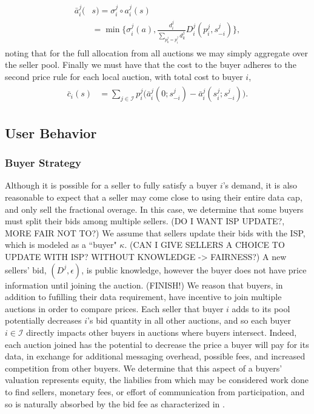 \documentclass[12pt]{article}
\theoremstyle{definition}
\newcommand{\mcI}{\mathcal{I}}
\newcommand{\g}{\sigma}
\begin{document}
\begin{multicols}{2}
\begin{align}
\begin{split}
    \bar{a}_i^j(&s) = \g_i^j \circ a_i^j(s) \\
    &= \min\bigg\lbrace \g_i^j(a), 
    \frac{d_i^j}{\displaystyle\sum_{p_k^j= p_i^j}d_k^j} 
D_i^j(p_i^j,s_{-i}^j)\bigg\rbrace,
\end{split}
\end{align}
noting that for the full allocation from all auctions we may simply aggregate
over the seller pool.
Finally we must have that the cost to the buyer adheres to the second price
rule for each local auction, with total cost to buyer $i$,
\begin{align}\label{datacost}
\begin{split}
    \bar{c}_i(s) &= \displaystyle\sum_{j\in\mcI} 
    p_i^j \bigg(\bar{a}_i^j(0; s_{-i}^j)
    -\bar{a}_i^j(s_i^j;s_{-i}^j)\bigg).
\end{split}
\end{align}

\subsection{User Behavior}
\subsubsection{Buyer Strategy}

Although it is possible for a seller to fully satisfy a buyer $i$'s demand, it
is also reasonable to expect that a seller may come close to using their
entire data cap, and only sell the fractional overage. In this case, we
determine that some buyers must split their bids among multiple sellers. 
(DO I WANT ISP UPDATE?, MORE FAIR NOT TO?)
We assume that sellers update their bids with the ISP, which is modeled as a
``buyer" $\kappa$. (CAN I GIVE SELLERS A CHOICE TO UPDATE WITH ISP? WITHOUT
KNOWLEDGE -> FAIRNESS?)
A new sellers' bid, $(D^j, \epsilon)$, is public knowledge, however the buyer does not have
price information until joining the auction. (FINISH!)
We reason that buyers,
in addition to fufilling their data requirement, have incentive to join
multiple auctions in order to compare prices. Each seller that buyer $i$ adds
to its pool potentially decreases $i$'s bid quantity in all other auctions, and
so each buyer $i\in\mcI$ directly impacts other buyers in auctions where buyers intersect.
Indeed, each auction joined has the potential to decrease the price a buyer
will pay for its data, in exchange for additional messaging overhead, possible
fees, and increased competition from other buyers. We determine that this aspect of
a buyers' valuation represents equity, the liabilies from which may be considered work done to find
sellers, monetary fees, or effort of communication from participation, and so
is naturally absorbed by the bid fee as characterized in \cite{semret}.


\end{multicols}
\end{document}
